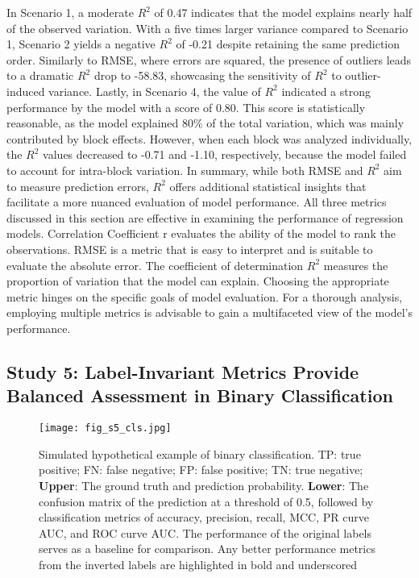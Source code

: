 In Scenario 1, a moderate $R^2$ of 0.47 indicates that the model explains nearly half of the observed variation. With a five times larger variance compared to Scenario 1, Scenario 2 yields a negative $R^2$ of -0.21 despite retaining the same prediction order. Similarly to RMSE, where errors are squared, the presence of outliers leads to a dramatic $R^2$ drop to -58.83, showcasing the sensitivity of $R^2$ to outlier-induced variance. Lastly, in Scenario 4, the value of $R^2$ indicated a strong performance by the model with a score of 0.80. This score is statistically reasonable, as the model explained 80\% of the total variation, which was mainly contributed by block effects. However, when each block was analyzed individually, the $R^2$ values decreased to -0.71 and -1.10, respectively, because the model failed to account for intra-block variation. In summary, while both RMSE and $R^2$ aim to measure prediction errors, $R^2$ offers additional statistical insights that facilitate a more nuanced evaluation of model performance.
All three metrics discussed in this section are effective in examining the performance of regression models. Correlation Coefficient r evaluates the ability of the model to rank the observations. RMSE is a metric that is easy to interpret and is suitable to evaluate the absolute error. The coefficient of determination $R^2$ measures the proportion of variation that the model can explain. Choosing the appropriate metric hinges on the specific goals of model evaluation. For a thorough analysis, employing multiple metrics is advisable to gain a multifaceted view of the model's performance.

\subsection{Study 5: Label-Invariant Metrics Provide Balanced Assessment in Binary Classification}

\begin{figure}[h]
    \centering
    \texttt{[image: fig\_s5\_cls.jpg]}
    \caption{Simulated hypothetical example of binary classification. TP: true positive; FN: false negative; FP: false positive; TN: true negative; \textbf{Upper}: The ground truth and prediction probability. \textbf{Lower}: The confusion matrix of the prediction at a threshold of 0.5, followed by classification metrics of accuracy, precision, recall, MCC, PR curve AUC, and ROC curve AUC. The performance of the original labels serves as a baseline for comparison. Any better performance metrics from the inverted labels are highlighted in bold and underscored}
    \label{fig:s5_cls}
\end{figure}


